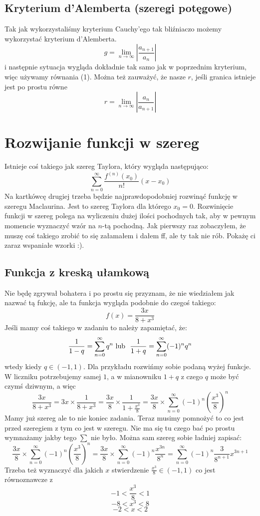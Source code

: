\documentclass[11pt]{article}
\begin{document}
\subsection{Kryterium d'Alemberta (szeregi potęgowe)}
\vbox{
    Tak jak wykorzystaliśmy kryterium Cauchy'ego tak bliźniaczo możemy wykorzystać
    kryterium d'Alemberta.
    \[
        g = \lim_{n\to\infty}{\left\lvert \frac{a_{n + 1}}{a_n} \right\rvert}
    \]
    i następnie sytuacja wygląda dokładnie tak samo jak w poprzednim kryterium, więc
    używamy równania (1). Można też zauważyć, że nasze $r$, jeśli granica istnieje
    jest po prostu równe 
    \[
        r = \lim_{n\to\infty}{\left\lvert \frac{a_{n}}{a_{n + 1}} \right\rvert}
    \]
}

\section{Rozwijanie funkcji w szereg}
\vbox{
    Istnieje coś takiego jak szereg Taylora, który wygląda następująco:
    \[
        \sum_{n = 0}^{\infty}\frac{f^{(n)}(x_0)}{n!}(x - x_0)
    \]
    Na kartkówcę drugiej trzeba będzie najprawdopodobniej rozwinąć funkcję w szeregu
    Maclaurina. Jest to szereg Taylora dla którego $x_0 = 0$.
    Rozwinięcie funkcji w szereg polega na wyliczeniu dużej ilości pochodnych tak,
    aby w pewnym momencie wyznaczyć wzór na $n$-tą pochodną. Jak pierwszy raz
    zobaczyłem, że muszę coś takiego zrobić to się załamałem i dałem ff, ale ty tak
    nie rób. Pokażę ci zaraz wspaniałe wzorki :).
}

\subsection{Funkcja z kreską ułamkową}
\vbox{
    Nie będę zgrywał bohatera i po prostu się przyznam, że nie wiedziałem
    jak nazwać tą fukcję, ale ta funkcja wygląda podobnie do czegoś takiego:
    \[
        f(x) = \frac{3x}{8 + x^3}
    \]
    Jeśli mamy coś takiego w zadaniu to należy zapamiętać, że:
    \[
        \frac{1}{1 - q} = \sum_{n = 0}^{\infty}q^n
        \text{\space lub \space}
        \frac{1}{1 + q} = \sum_{n = 0}^{\infty}(-1)^n q^n
    \]
    wtedy kiedy $q \in (-1, 1)$. Dla przykładu rozwińmy sobie podaną wyżej funkcje. W liczniku potrzebujemy samej
    $1$, a w mianowniku $1 + q$ z czego $q$ może być czymś dziwnym, a więc
    \[
        \frac{3x}{8 + x^3} = 
        3x \times \frac{1}{{8 + x^3}} =
        \frac{3x}{8} \times \frac{1}{{1 + \frac{x^3}{8}}} = 
        \frac{3x}{8} \times \sum_{n = 0}^{\infty}(-1)^n (\frac{x^3}{8})^n
    \]
    Mamy już szereg ale to nie koniec zadania. Teraz musimy pomnożyć
    to co jest przed szeregiem z tym co jest w szeregu. Nie ma się tu czego
    bać po prostu wymnażamy jakby tego $\sum$ nie było. Można sam szereg sobie
    ładniej zapisać:
    \[
        \frac{3x}{8} \times \sum_{n = 0}^{\infty}(-1)^n (\frac{x^3}{8})^n = 
        \frac{3x}{8} \times \sum_{n = 0}^{\infty}(-1)^n \frac{x^{3n}}{8^{n}} = 
        \sum_{n = 0}^{\infty}(-1)^n \frac{3}{8^{n + 1}}x^{3n + 1}
    \]
    Trzeba też wyznaczyć dla jakich $x$ stwierdzenie $\frac{x^3}{8} \in (-1, 1)$ co jest równoznawcze z
    \[
        -1 < \frac{x^3}{8} < 1
    \]
    \[
        -8 < {x^3} < 8
    \]
    \[
        -2 < x < 2
    \]
}
\end{document}
